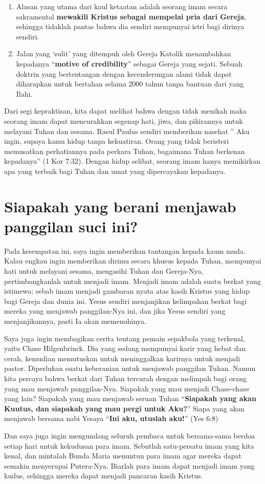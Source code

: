 \begin{enumerate}
\item Alasan yang utama dari kaul ketaatan adalah seorang imam secara sakramental \textbf{mewakili Kristus sebagai mempelai pria dari Gereja}, sehingga tidaklah pantas bahwa dia sendiri mempunyai istri bagi dirinya sendiri.
\item Jalan yang ‘sulit’ yang ditempuh oleh Gereja Katolik menambahkan kepadanya “\textbf{motive of credibility}” sebagai Gereja yang sejati. Sebuah doktrin yang bertentangan dengan kecenderungan alami tidak dapat diharapkan untuk bertahan selama 2000 tahun tanpa bantuan dari yang Ilahi.
\end{enumerate}

Dari segi kepraktisan, kita dapat melihat bahwa dengan tidak menikah maka seorang imam dapat mencurahkan segenap hati, jiwa, dan pikirannya untuk melayani Tuhan dan sesama. Rasul Paulus sendiri memberikan nasehat ” Aku ingin, supaya kamu hidup tanpa kekuatiran. Orang yang tidak beristeri memusatkan perhatiannya pada perkara Tuhan, bagaimana Tuhan berkenan kepadanya” (1 Kor 7:32). Dengan hidup selibat, seorang imam hanya memikirkan apa yang terbaik bagi Tuhan dan umat yang dipercayakan kepadanya.

\section*{Siapakah yang berani menjawab panggilan suci ini?}

Pada kesempatan ini, saya ingin memberikan tantangan kepada kaum muda. Kalau engkau ingin memberikan dirimu secara khusus kepada Tuhan, mempunyai hati untuk melayani sesama, mengasihi Tuhan dan Gereja-Nya, pertimbangkanlah untuk menjadi imam. Menjadi imam adalah suatu berkat yang istimewa; sebab imam menjadi gambaran nyata atas kasih Kristus yang hidup bagi Gereja dan dunia ini. Yesus sendiri menjanjikan kelimpahan berkat bagi mereka yang menjawab panggilan-Nya ini, dan jika Yesus sendiri yang menjanjikannya, pasti Ia akan memenuhinya.

Saya juga ingin membagikan cerita tentang pemain sepakbola yang terkenal, yaitu Chase Hilgenbrinck. Dia yang sedang mempunyai karir yang hebat dan cerah, kemudian memutuskan untuk meninggalkan karirnya untuk menjadi pastor. Diperlukan suatu keberanian untuk menjawab panggilan Tuhan. Namun kita percaya bahwa berkat dari Tuhan tercurah dengan melimpah bagi orang yang mau menjawab panggilan-Nya. Siapakah yang mau menjadi Chase-chase yang lain? Siapakah yang mau menjawab seruan Tuhan “\textbf{Siapakah yang akan Kuutus, dan siapakah yang mau pergi untuk Aku?}” Siapa yang akan menjawab bersama nabi Yesaya “\textbf{Ini aku, utuslah aku!}” (Yes 6:8)

Dan saya juga ingin mengundang seluruh pembaca untuk bersama-sama berdoa setiap hari untuk kekudusan para imam. Sebutlah satu-persatu imam yang kita kenal, dan mintalah Bunda Maria menuntun para imam agar mereka dapat semakin menyerupai Putera-Nya. Biarlah para imam dapat menjadi imam yang kudus, sehingga mereka dapat menjadi pancaran kasih Kristus.

